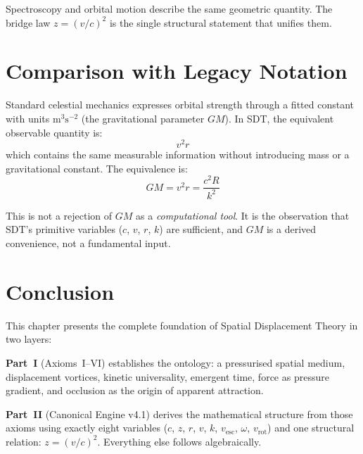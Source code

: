 Spectroscopy and orbital motion describe the same geometric quantity.  The bridge law $z = (v/c)^2$ is the single structural statement that unifies them.


\section{Comparison with Legacy Notation}
\label{sec:legacy}

Standard celestial mechanics expresses orbital strength through a fitted constant with units $\text{m}^3\text{s}^{-2}$ (the gravitational parameter $GM$).  In SDT, the equivalent observable quantity is:
\begin{equation}\label{eq:v2r}
  v^2 r
\end{equation}
which contains the same measurable information without introducing mass or a gravitational constant.  The equivalence is:
\begin{equation}\label{eq:gm-equiv}
  GM = v^2 r = \frac{c^2 R}{k^2}
\end{equation}

This is not a rejection of $GM$ as a \emph{computational tool}.  It is the observation that SDT's primitive variables ($c$, $v$, $r$, $k$) are sufficient, and $GM$ is a derived convenience, not a fundamental input.



\section{Conclusion}

This chapter presents the complete foundation of Spatial Displacement Theory in two layers:

\textbf{Part~I} (Axioms~I--VI) establishes the ontology: a pressurised spatial medium, displacement vortices, kinetic universality, emergent time, force as pressure gradient, and occlusion as the origin of apparent attraction.

\textbf{Part~II} (Canonical Engine v4.1) derives the mathematical structure from those axioms using exactly eight variables ($c$, $z$, $r$, $v$, $k$, $v_{\text{esc}}$, $\omega$, $v_{\text{rot}}$) and one structural relation: $z = (v/c)^2$.  Everything else follows algebraically.

